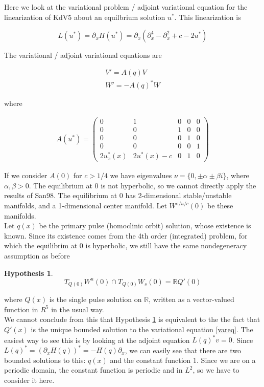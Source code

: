 \documentclass[12pt]{article}
\def\R{{\mathbb R}}
\newtheorem{hypothesis}{Hypothesis}
\begin{document}
Here we look at the variational problem / adjoint variational equation for the linearization of KdV5 about an equilbrium solution $u^*$. This linearization is

\begin{equation}
L(u^*) = \partial_x H(u^*) = \partial_x ( \partial_x^4 - \partial_x^2 + c - 2 u^*)
\end{equation}

The variational / adjoint variational equations are

\begin{align}
V' = A(q)V \label{vareq} \\
W' = -A(q)^*W \label{adjvareq}
\end{align}

where

\begin{align}
A(u^*) = \begin{pmatrix}0 & 1 & 0 & 0 & 0 \\0 & 0 & 1 & 0 & 0 \\0 & 0 & 0 & 1 & 0 \\0 & 0 & 0 & 0 & 1 \\
2u^*_x(x) & 2u^*(x) - c & 0 & 1 & 0 \end{pmatrix}
\end{align}

If we consider $A(0)$ for $c > 1/4$ we have eigenvalues $\nu = \{ 0, \pm \alpha \pm \beta i\}$, where $\alpha, \beta > 0$. The equilibrium at 0 is not hyperbolic, so we cannot directly apply the results of San98. The equilibrium at 0 has 2-dimensional stable/unstable manifolds, and a 1-dimensional center manifold. Let $W^{s/u/c}(0)$ be these manifolds.\\

Let $q(x)$ be the primary pulse (homoclinic orbit) solution, whose existence is known. Since its existence comes from the 4th order (integrated) problem, for which the equilibrim at 0 is hyperbolic, we still have the same nondegeneracy assumption as before

\begin{hypothesis}\label{nondegen}
\[
T_{Q(0)} W^u(0) \cap T_{Q(0)} W_s(0) = \R Q'(0)
\]
\end{hypothesis}

where $Q(x)$ is the single pulse solution on $\R$, written as a vector-valued function in $R^5$ in the usual way.\\

We cannot conclude from this that Hypothesis \ref{nondegen} is equivalent to the the fact that $Q'(x)$ is the unique bounded solution to the variational equation \eqref{vareq}. The easiest way to see this is by looking at the adjoint equation $L(q)^* v = 0$. Since $L(q)^* = (\partial_x H(q))^* = -H(q) \partial_x$, we can easily see that there are two bounded solutions to this: $q(x)$ and the constant function $1$. Since we are on a periodic domain, the constant function is periodic and in $L^2$, so we have to consider it here.\\
\end{document}
